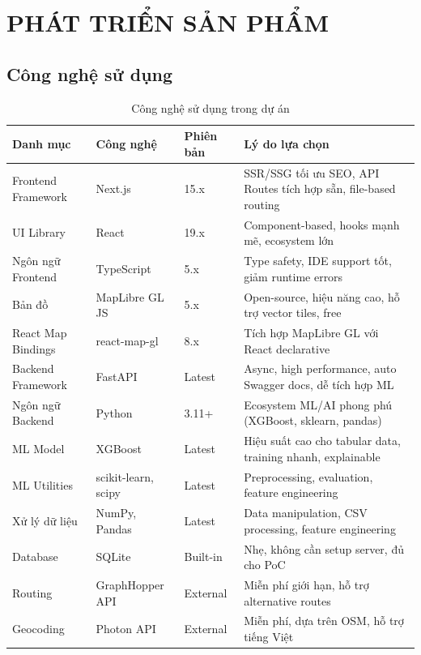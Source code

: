 \documentclass[12pt,a4paper]{article}
\begin{document}
\section{PHÁT TRIỂN SẢN PHẨM}

\subsection{Công nghệ sử dụng}
\begin{table}[H]
\centering
\caption{Công nghệ sử dụng trong dự án}
\begin{tabularx}{\textwidth}{L{3cm}L{3cm}L{1.2cm}Y}
\toprule
\textbf{Danh mục} & \textbf{Công nghệ} & \textbf{Phiên bản} & \textbf{Lý do lựa chọn} \\
\midrule
Frontend Framework & Next.js & 15.x & SSR/SSG tối ưu SEO, API Routes tích hợp sẵn, file-based routing \\[4pt]
UI Library & React & 19.x & Component-based, hooks mạnh mẽ, ecosystem lớn \\[4pt]
Ngôn ngữ Frontend & TypeScript & 5.x & Type safety, IDE support tốt, giảm runtime errors \\[4pt]
Bản đồ & MapLibre GL JS & 5.x & Open-source, hiệu năng cao, hỗ trợ vector tiles, free \\[4pt]
React Map Bindings & react-map-gl & 8.x & Tích hợp MapLibre GL với React declarative \\[4pt]
Backend Framework & FastAPI & Latest & Async, high performance, auto Swagger docs, dễ tích hợp ML \\[4pt]
Ngôn ngữ Backend & Python & 3.11+ & Ecosystem ML/AI phong phú (XGBoost, sklearn, pandas) \\[4pt]
ML Model & XGBoost & Latest & Hiệu suất cao cho tabular data, training nhanh, explainable \\[4pt]
ML Utilities & scikit-learn, scipy & Latest & Preprocessing, evaluation, feature engineering \\[4pt]
Xử lý dữ liệu & NumPy, Pandas & Latest & Data manipulation, CSV processing, feature engineering \\[4pt]
Database & SQLite & Built-in & Nhẹ, không cần setup server, đủ cho PoC \\[4pt]
Routing & GraphHopper API & External & Miễn phí giới hạn, hỗ trợ alternative routes \\[4pt]
Geocoding & Photon API & External & Miễn phí, dựa trên OSM, hỗ trợ tiếng Việt \\[4pt]

\end{tabularx}
\end{table}
\end{document}
